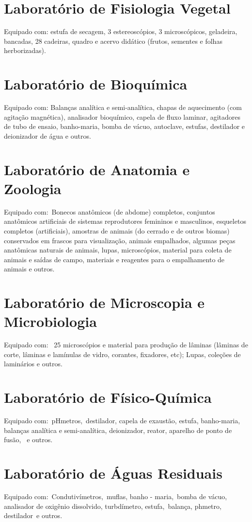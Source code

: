 \documentclass[
	10pt,				%
	openright,			%
	twoside,			%
	a4paper,			%
	english,			%
	french,				%
	brazil,				%
	sumario=tradicional
]{abntex2}
\begin{document}
\section*{Laboratório de Fisiologia Vegetal}
Equipado com: estufa de secagem, 3 estereoscópios, 3 microscópicos, geladeira, bancadas, 28 cadeiras, quadro e acervo didático (frutos, sementes e folhas herborizadas). 

\section*{Laboratório de Bioquímica}
Equipado com: Balanças analítica e semi-analítica, chapas de aquecimento (com agitação magnética), analisador bioquímico, capela de fluxo laminar, agitadores de tubo de ensaio, banho-maria, bomba de vácuo, autoclave, estufas, destilador e deionizador de água e outros.

\section*{Laboratório de Anatomia e Zoologia}
Equipado com: Bonecos anatômicos (de abdome) completos, conjuntos anatômicos artificiais de sistemas reprodutores femininos e masculinos, esqueletos completos (artificiais), amostras de animais (do cerrado e de outros biomas) conservados em frascos para visualização, animais empalhados, algumas peças anatômicas naturais de animais, lupas, microscópios, material para coleta de animais e saídas de campo, materiais e reagentes para o empalhamento de animais e outros.

\section*{Laboratório de Microscopia e Microbiologia}
Equipado com:  25 microscópios e material para produção de lâminas (lâminas de corte, lâminas e lamínulas de vidro, corantes, fixadores, etc); Lupas, coleções de laminários e outros.

\section*{Laboratório de Físico-Química}
Equipado com: pHmetros, destilador, capela de exaustão, estufa, banho-maria, balanças analítica e semi-analítica, deionizador, reator, aparelho de ponto de fusão,  e outros.

\section*{Laboratório de Águas Residuais}
Equipado com: Condutivímetros, muflas, banho - maria, bomba de vácuo, analisador de oxigênio dissolvido, turbdímetro, estufa, balança, phmetro, destilador e outros.
\end{document}
